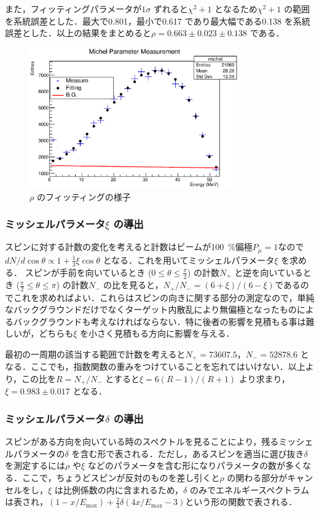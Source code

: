 また，フィッティングパラメータが$1\sigma$ ずれると$\chi^{2}+1$ となるため$\chi^{2} + 1$ の範囲を系統誤差とした．最大で0.801，最小で0.617 であり最大幅である0.138 を系統誤差とした．以上の結果をまとめると$\rho=0.663 \pm 0.023 \pm 0.138$ である．

\begin{figure}[hbt]
\centering
\includegraphics[width=0.8\textwidth]{figure/hatano/rho.eps}
\caption{$\rho$ のフィッティングの様子}
\label{hatano_fig:rho}
\end{figure}

\subsubsection{ミッシェルパラメータ$\xi$ の導出}
スピンに対する計数の変化を考えると計数はビームが100~\%偏極$P_{\mu} = 1$なので$dN / d \cos \theta \propto 1 + \frac{1}{3} \xi \cos \theta$ となる．これを用いてミッシェルパラメータ$\xi$ を求める．
スピンが手前を向いているとき ($0\leq\theta\leq\frac{\pi}{2}$) の計数$N_+$ と逆を向いているとき ($\frac{\pi}{2}\leq\theta\leq\pi$) の計数$N_-$ の比を見ると，$N_{+} / N_{-} =  (6 + \xi) / (6 -\xi)$であるのでこれを求めればよい．これらはスピンの向きに関する部分の測定なので，単純なバックグラウンドだけでなくターゲット内散乱により無偏極となったものによるバックグラウンドも考えなければならない．特に後者の影響を見積もる事は難しいが，どちらも$\xi$ を小さく見積もる方向に影響を与える．

最初の一周期の該当する範囲で計数を考えると$N_+=73607.5$，$N_-=52878.6$ となる．ここでも，指数関数の重みをつけていることを忘れてはいけない．以上より，この比を$R=N_{+} / N_{-}$ とすると$\xi=6(R-1) / (R+1)$ より求まり，$\xi=0.983\pm0.017$ となる．

\subsubsection{ミッシェルパラメータ$\delta$ の導出}
スピンがある方向を向いている時のスペクトルを見ることにより，残るミッシェルパラメータの$\delta$ を含む形で表される．ただし，あるスピンを適当に選び抜き$\delta$ を測定するには$\rho$ や$\xi$ などのパラメータを含む形になりパラメータの数が多くなる．ここで，ちょうどスピンが反対のものを差し引くと$\rho$ の関わる部分がキャンセルをし，$\xi$ は比例係数の内に含まれるため，$\delta$ のみでエネルギースペクトラムは表され，$(1-x / E_\mathrm{max})+\frac{2}{3}\delta(4x / E_\mathrm{max} - 3)$という形の関数で表される．

